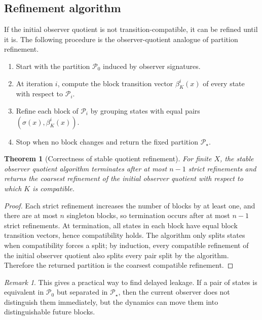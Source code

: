 \documentclass[11pt]{article}
\theoremstyle{definition}
\theoremstyle{plain}
\newtheorem{theorem}[definition]{Theorem}
\theoremstyle{remark}
\newtheorem{remark}[definition]{Remark}
\begin{document}
\subsection{Refinement algorithm}

If the initial observer quotient is not transition-compatible, it can be refined until it is. The following procedure is the observer-quotient analogue of partition refinement.

\begin{enumerate}[leftmargin=2em,label=\textnormal{\arabic*.}]
    \item Start with the partition $\mathcal{P}_0$ induced by observer signatures.
    \item At iteration $i$, compute the block transition vector $\beta_K^i(x)$ of every state with respect to $\mathcal{P}_i$.
    \item Refine each block of $\mathcal{P}_i$ by grouping states with equal pairs $(\sigma(x),\beta_K^i(x))$.
    \item Stop when no block changes and return the fixed partition $\mathcal{P}_\star$.
\end{enumerate}

\begin{theorem}[Correctness of stable quotient refinement]
For finite $X$, the stable observer quotient algorithm terminates after at most $n-1$ strict refinements and returns the coarsest refinement of the initial observer quotient with respect to which $K$ is compatible.
\end{theorem}

\begin{proof}
Each strict refinement increases the number of blocks by at least one, and there are at most $n$ singleton blocks, so termination occurs after at most $n-1$ strict refinements. At termination, all states in each block have equal block transition vectors, hence compatibility holds. The algorithm only splits states when compatibility forces a split; by induction, every compatible refinement of the initial observer quotient also splits every pair split by the algorithm. Therefore the returned partition is the coarsest compatible refinement.
\end{proof}

\begin{remark}
This gives a practical way to find delayed leakage. If a pair of states is equivalent in $\mathcal{P}_0$ but separated in $\mathcal{P}_\star$, then the current observer does not distinguish them immediately, but the dynamics can move them into distinguishable future blocks.
\end{remark}
\end{document}
